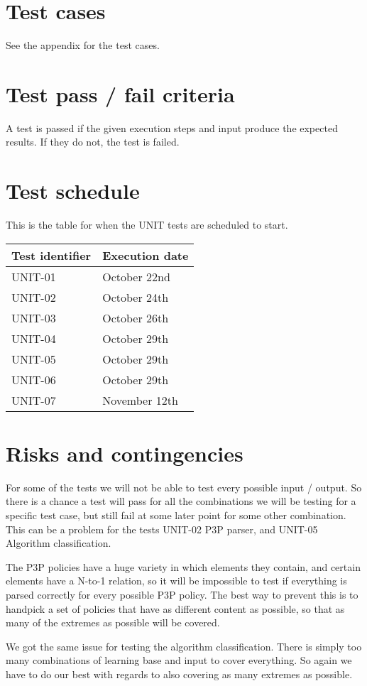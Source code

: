 	\section{Test cases}
		See the appendix for the test cases.

	\section{Test pass / fail criteria}
		A test is passed if the given execution steps and input produce the expected results. If they do not, the test is failed.

	\section {Test schedule}
		This is the table for when the UNIT tests are scheduled to start.

		\begin{center}
			\begin{tabular}{ |  p{5cm} | p{5cm} | }
				\hline
				Test identifier & Execution date \\ [3pt] \hline \hline
				UNIT-01 & October 22nd \\  [3pt] \hline
				UNIT-02 & October 24th \\  [3pt] \hline
				UNIT-03 & October 26th \\  [3pt] \hline
				UNIT-04 & October 29th \\  [3pt] \hline
				UNIT-05 & October 29th \\  [3pt] \hline
				UNIT-06 & October 29th \\  [3pt] \hline
				UNIT-07 & November 12th \\  [3pt] \hline
			\end{tabular}
		\end{center}

\section{Risks and contingencies}
For some of the tests we will not be able to test every possible input / output. So there is a chance a test will pass for all the combinations we will be testing for a specific test case, but still fail at some later point for some other combination. This can be a problem for the tests UNIT-02 P3P parser, and UNIT-05 Algorithm classification.

The P3P policies have a huge variety in which elements they contain, and certain elements have a N-to-1 relation, so it will be impossible to test if everything is parsed correctly for every possible P3P policy. The best way to prevent this is to handpick a set of policies that have as different content as possible, so that as many of the extremes as possible will be covered.

We got the same issue for testing the algorithm classification. There is simply too many combinations of learning base and input to cover everything. So again we have to do our best with regards to also covering as many extremes as possible.
